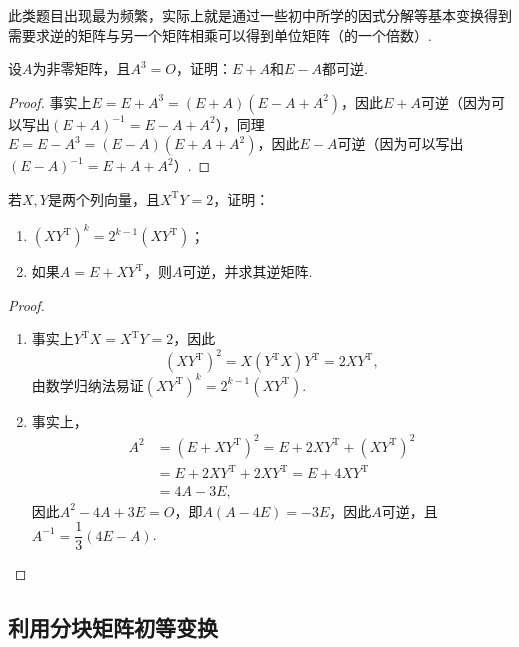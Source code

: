 此类题目出现最为频繁，实际上就是通过一些初中所学的因式分解等基本变换得到需要求逆的矩阵与另一个矩阵相乘可以得到单位矩阵（的一个倍数）.
\begin{example}{}{}
    设$A$为非零矩阵，且$A^3=O$，证明：$E+A$和$E-A$都可逆.
\end{example}

\begin{proof}
    事实上$E=E+A^3=(E+A)(E-A+A^2)$，因此$E+A$可逆（因为可以写出$(E+A)^{-1}=E-A+A^2$），同理$E=E-A^3=(E-A)(E+A+A^2)$，因此$E-A$可逆（因为可以写出$(E-A)^{-1} = E + A + A^2$）.
\end{proof}

\begin{example}{}{}
    若$X,Y$是两个列向量，且$X^\mathrm{T}Y=2$，证明：
    \begin{enumerate}
        \item $(XY^\mathrm{T})^k=2^{k-1}(XY^{\mathrm{T}})$；

        \item 如果$A=E+XY^\mathrm{T}$，则$A$可逆，并求其逆矩阵.
    \end{enumerate}
\end{example}

\begin{proof}
    \begin{enumerate}
        \item 事实上$Y^\mathrm{T}X=X^\mathrm{T}Y=2$，因此
              \[(XY^\mathrm{T})^2=X(Y^\mathrm{T}X)Y^\mathrm{T}=2XY^\mathrm{T},\]
              由数学归纳法易证$(XY^\mathrm{T})^k=2^{k-1}(XY^\mathrm{T})$.

        \item 事实上，
              \begin{align*}
                  A^2 & =(E+XY^\mathrm{T})^2=E+2XY^\mathrm{T}+(XY^\mathrm{T})^2 \\
                      & =E+2XY^\mathrm{T}+2XY^\mathrm{T}=E+4XY^\mathrm{T}       \\
                      & =4A-3E,
              \end{align*}
              因此$A^2-4A+3E=O$，即$A(A-4E)=-3E$，因此$A$可逆，且$A^{-1}=\dfrac{1}{3}(4E-A)$.
    \end{enumerate}
\end{proof}

\subsection{利用分块矩阵初等变换}

